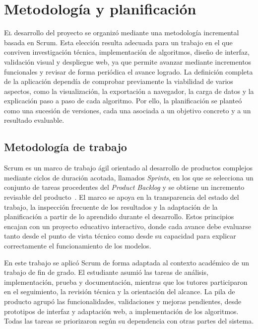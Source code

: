\chapter{Metodología y planificación}
\label{chap:metodologia_y_planificacion}

\lettrine{E}{l} desarrollo del proyecto se organizó mediante una metodología incremental basada en Scrum.
Esta elección resulta adecuada para un trabajo en el que conviven investigación técnica, implementación de algoritmos, diseño de interfaz, validación visual y despliegue web, ya que permite avanzar mediante incrementos funcionales y revisar de forma periódica el avance logrado.
La definición completa de la aplicación dependía de comprobar previamente la viabilidad de varios aspectos, como la visualización, la exportación a navegador, la carga de datos y la explicación paso a paso de cada algoritmo.
Por ello, la planificación se planteó como una sucesión de versiones, cada una asociada a un objetivo concreto y a un resultado evaluable.

\section{Metodología de trabajo}
\label{sec:metodologia_trabajo}

Scrum es un marco de trabajo ágil orientado al desarrollo de productos complejos mediante ciclos de duración acotada, llamados \textit{Sprints}, en los que se selecciona un conjunto de tareas procedentes del \textit{Product Backlog} y se obtiene un incremento revisable del producto~\cite{ScrumGuide}.
El marco se apoya en la transparencia del estado del trabajo, la inspección frecuente de los resultados y la adaptación de la planificación a partir de lo aprendido durante el desarrollo.
Estos principios encajan con un proyecto educativo interactivo, donde cada avance debe evaluarse tanto desde el punto de vista técnico como desde su capacidad para explicar correctamente el funcionamiento de los modelos.

En este trabajo se aplicó Scrum de forma adaptada al contexto académico de un trabajo de fin de grado.
El estudiante asumió las tareas de análisis, implementación, prueba y documentación, mientras que los tutores participaron en el seguimiento, la revisión técnica y la orientación del alcance.
La pila de producto agrupó las funcionalidades, validaciones y mejoras pendientes, desde prototipos de interfaz y adaptación web, a implementación de los algoritmos.
Todas las tareas se priorizaron según su dependencia con otras partes del sistema.

